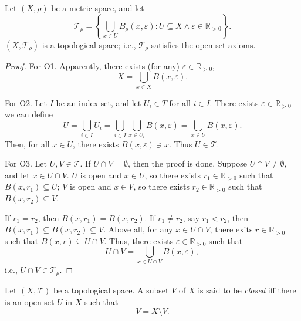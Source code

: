 \begin{theorem}
	Let $(X, \rho)$ be a metric space, and let
	$$
	\mathcal T_\rho = \left\{ \bigcup_{x \in U} B_\rho (x, \varepsilon) : U \subseteq X \land \varepsilon \in \mathbb R_{> 0} \right\}.
	$$
	$(X, \mathcal T_\rho)$ is a topological space; i.e., $\mathcal T_\rho$ satisfies the open set axioms.
	
	\begin{proof}
		For O1. Apparently, there exists (for any) $\varepsilon \in \mathbb R_{> 0}$,
		$$
		X = \bigcup_{x \in X} B(x, \varepsilon).
		$$
		
		For O2. Let $I$ be an index set, and let $U_i \in T$ for all $i \in I$. There exists $\varepsilon \in \mathbb R_{> 0}$ we can define
		$$
		U = \bigcup_{i \in I} U_i = \bigcup_{i \in I} \bigcup_{x \in U_i} B(x, \varepsilon) = \bigcup_{x \in U} B(x, \varepsilon).
		$$
		Then, for all $x \in U$, there exists $B(x, \varepsilon) \ni x$. Thus $U \in \mathcal T$.
		
		For O3. Let $U, V \in \mathcal T$. If $U \cap V = \emptyset$, then the proof is done. Suppose $U \cap V \ne \emptyset$, and let $x \in U \cap V$. $U$ is open and $x \in U$, so there exists $r_1 \in \mathbb R_{> 0}$ such that $B(x, r_1) \subseteq U$; $V$ is open and $x \in V$, so there exists $r_2 \in \mathbb R_{> 0}$ such that $B(x, r_2) \subseteq V$.
		
		If $r_1 = r_2$, then $B(x, r_1) = B(x, r_2)$. If $r_1 \ne r_2$, say $r_1 < r_2$, then $B(x, r_1) \subseteq B(x, r_2) \subseteq V$. Above all, for any $x \in U \cap V$, there exits $r \in \mathbb R_{>0}$ such that $B(x, r) \subseteq U \cap V$. Thus, there exists $\varepsilon \in \mathbb R_{> 0}$ such that
		$$
		U \cap V = \bigcup_{x \in U \cap V} B(x, \varepsilon),
		$$
		i.e., $U \cap V \in \mathcal T_\rho$.
	\end{proof}
\end{theorem}



\begin{definition}
	\label{def: closed sets}
	Let $(X, \mathcal T)$ be a topological space. A subset $V$ of $X$ is said to be \textit{closed} iff there is an open set $U$ in $X$ such that
	$$
	V = X \setminus V.
	$$
\end{definition}


